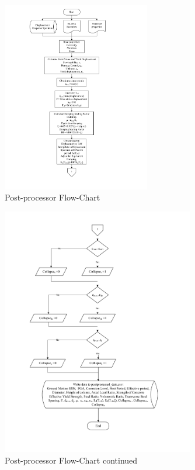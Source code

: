 \begin{figure}[htp]
	\centering
	\includegraphics[width=0.575\textwidth]{VAC Thesis 2.0/Chapter-5/figs/PostProcessor_FlowCharts_01.pdf}
	\caption{Post-processor Flow-Chart}
	\label{fig:postproc_flowchart_01}
\end{figure}

\begin{figure}[htp]
	\centering
	\includegraphics[width=0.75\textwidth]{VAC Thesis 2.0/Chapter-5/figs/PostProcessor_FlowCharts_02.pdf}
	\caption{Post-processor Flow-Chart continued}
	\label{fig:postproc_flowchart_02}
\end{figure}

